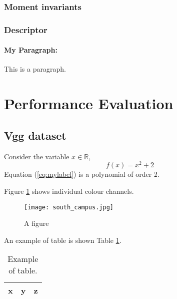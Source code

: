 \documentclass[a4paper,11pt]{article}
\begin{document}
\subsubsection{Moment invariants}
\subsubsection{Descriptor}

\paragraph{My Paragraph:} 
This is a paragraph.


\section{Performance Evaluation}

\subsection{Vgg dataset}
Consider the variable $x \in \mathbb{R}$, 
\begin{equation}
f(x)=x^2+2 \label{eq:mylabel}
\end{equation}
Equation (\ref{eq:mylabel}) is a polynomial of order 2.


Figure \ref{fig:myfig} shows individual colour channels. 
\begin{figure}[!ht]
\begin{center}
\texttt{[image: south\_campus.jpg]}
\end{center}
\vspace{-20pt}
  \caption{A figure}\label{fig:myfig}
  \vspace{-10pt}
\end{figure}




An example of table is shown Table \ref{tab:mytab}.
\begin{table}[!ht]
\begin{center}
\begin{tabular}{|c|c|c|}
\hline
x & y & z\\
\hline
\end{tabular}
\end{center}
\vspace{-20pt}
\caption{Example of table.} \label{tab:mytab}
  \vspace{-10pt}
\end{table}
\end{document}
